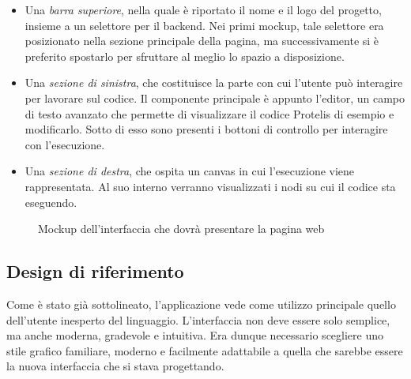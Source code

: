       \begin{itemize}
        \item
          Una \emph{barra superiore}, nella quale è riportato il nome e il logo del progetto, insieme a un selettore per il backend.
          Nei primi mockup, tale selettore era posizionato nella sezione principale della pagina, ma successivamente si è preferito spostarlo per sfruttare al meglio lo spazio a disposizione.
        \item
          Una \emph{sezione di sinistra}, che costituisce la parte con cui l'utente può interagire per lavorare sul codice.
          Il componente principale è appunto l'editor, un campo di testo avanzato che permette di visualizzare il codice Protelis di esempio e modificarlo.
          Sotto di esso sono presenti i bottoni di controllo per interagire con l'esecuzione.
        \item
          Una \emph{sezione di destra}, che ospita un canvas in cui l'esecuzione viene rappresentata.
          Al suo interno verranno visualizzati i nodi su cui il codice sta eseguendo.
      \end{itemize}

      \begin{figure}[htbp]
        \centering
        \caption{Mockup dell'interfaccia che dovrà presentare la pagina web}%
        \label{fig:mockup}
      \end{figure}

    \subsection{Design di riferimento}\label{subsec:material}
      Come è stato già sottolineato, l'applicazione vede come utilizzo principale quello dell'utente inesperto del linguaggio.
      L'interfaccia non deve essere solo semplice, ma anche moderna, gradevole e intuitiva.
      Era dunque necessario scegliere uno stile grafico familiare, moderno e facilmente adattabile a quella che sarebbe essere la nuova interfaccia che si stava progettando.

